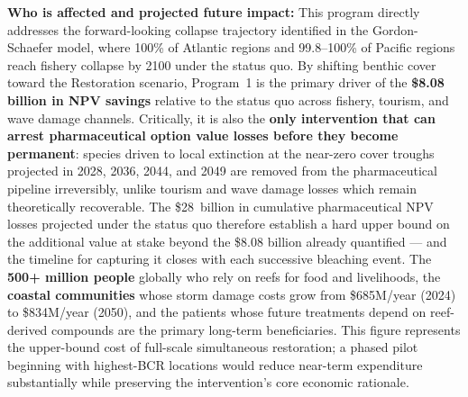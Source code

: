 \documentclass[10pt,letterpaper]{article}
\newcounter{gs}
\begin{document}
\begin{tcolorbox}[title=Program 1: Coral Reef Restoration --- \$1{,}923M Annual Total,
  colback=blue!5, colframe=blue!50!black, fonttitle=\bfseries, breakable]
  \medskip
  \textbf{Who is affected and projected future impact:} This program directly addresses the
  forward-looking collapse trajectory identified in the Gordon-Schaefer model, where 100\% of
  Atlantic regions and 99.8--100\% of Pacific regions reach fishery collapse by 2100 under the
  status quo. By shifting benthic cover toward the Restoration scenario, Program~1 is the primary
  driver of the \textbf{\$8.08 billion in NPV savings} relative to the status quo across fishery,
  tourism, and wave damage channels. Critically, it is also the \textbf{only intervention that can
  arrest pharmaceutical option value losses before they become permanent}: species driven to local
  extinction at the near-zero cover troughs projected in 2028, 2036, 2044, and 2049 are removed
  from the pharmaceutical pipeline irreversibly, unlike tourism and wave damage losses which remain
  theoretically recoverable. The \$28~billion in cumulative pharmaceutical NPV losses projected
  under the status quo therefore establish a hard upper bound on the additional value at stake
  beyond the \$8.08 billion already quantified --- and the timeline for capturing it closes with
  each successive bleaching event. The \textbf{500+ million people} globally who rely on reefs for
  food and livelihoods, the \textbf{coastal communities} whose storm damage costs grow from
  \$685M/year (2024) to \$834M/year (2050), and the patients whose future treatments depend on
  reef-derived compounds are the primary long-term beneficiaries. This figure represents the
  upper-bound cost of full-scale simultaneous restoration; a phased pilot beginning with
  highest-BCR locations would reduce near-term expenditure substantially while preserving the
  intervention's core economic rationale.
\end{tcolorbox}

\medskip
\end{document}
